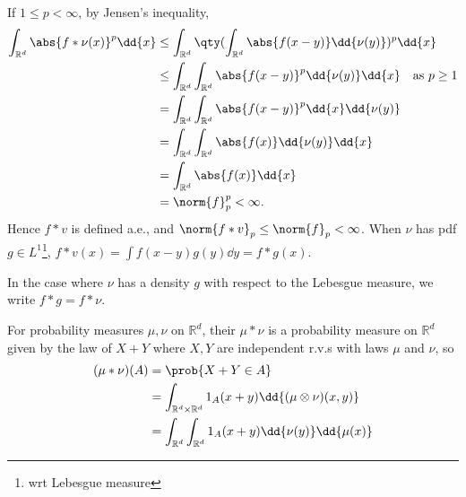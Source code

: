 \begin{remark}
	If $1 \leq p < \infty$, by Jensen's inequality,
	\begin{align*}
		\int_{\mathbb{R}^d} \abs{f \ast \nu(x)}^p \dd{x} &\leq \int_{\mathbb R^d} \qty( \int_{\mathbb R^d} \abs{f(x-y)} \dd{\nu(y)} )^p \dd{x} \\
		&\leq \int_{\mathbb R^d} \int_{\mathbb R^d} \abs{f(x-y)}^p \dd{\nu(y)} \dd{x} \quad \text{as $p \geq 1$}\\
		&= \int_{\mathbb R^d} \int_{\mathbb R^d} \abs{f(x-y)}^p \dd{x} \dd{\nu(y)} \\
		&= \int_{\mathbb R^d} \int_{\mathbb R^d} \abs{f(x)} \dd{\nu(y)} \dd{x} \\
		&= \int_{\mathbb R^d} \abs{f(x)} \dd{x} \\
		&= \norm{f}_p^p < \infty.
	\end{align*}
	Hence $f \ast v$ is defined a.e., and $\norm{f \ast v}_p \leq \norm{f}_p < \infty$.
	When $\nu$ has pdf $g \in L^1$\footnote{wrt Lebesgue measure}, $f \ast v(x) = \int f(x-y) g(y) \dd{y} = f \ast g(x)$.




\end{remark}

In the case where $\nu$ has a density $g$ with respect to the Lebesgue measure, we write $f \ast g = f \ast \nu$.

\begin{definition}[Convolution]
	For probability measures $\mu, \nu$ on $\mathbb R^d$, their  $\mu \ast \nu$ is a probability measure on $\mathbb R^d$ given by the law of $X + Y$ where $X, Y$ are independent r.v.s with laws $\mu$ and $\nu$, so
	\begin{align*}
		(\mu \ast \nu)(A) &= \prob{X+Y \in A} \\
		&= \int_{\mathbb R^d \times \mathbb R^d} 1_A(x+y) \dd{(\mu \otimes \nu)(x, y)} \\
		&= \int_{\mathbb R^d} \int_{\mathbb R^d} 1_A(x+y) \dd{\nu(y)} \dd{\mu(x)}
	\end{align*}
\end{definition}

